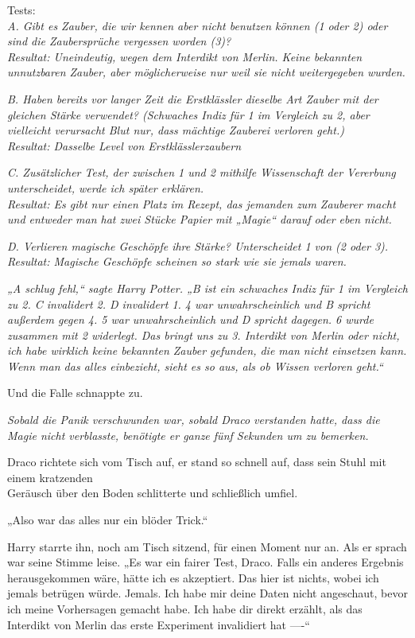 {Tests:\\ \emph{A. Gibt es Zauber, die wir kennen aber nicht benutzen können (1 oder 2) oder sind die Zaubersprüche vergessen worden (3)?}\\ \emph{Resultat: Uneindeutig, wegen dem Interdikt von Merlin. Keine bekannten unnutzbaren Zauber, aber möglicherweise nur weil sie nicht weitergegeben wurden.}

\emph{B. Haben bereits vor langer Zeit die Erstklässler dieselbe Art Zauber mit der gleichen Stärke verwendet? (Schwaches Indiz für 1 im Vergleich zu 2, aber vielleicht verursacht Blut nur, dass mächtige Zauberei verloren geht.)}\\ \emph{Resultat: Dasselbe Level von Erstklässlerzaubern}

\emph{C. Zusätzlicher Test, der zwischen 1 und 2 mithilfe Wissenschaft der Vererbung unterscheidet, werde ich später erklären.}\\ \emph{Resultat: Es gibt nur einen Platz im Rezept, das jemanden zum Zauberer macht und entweder man hat zwei Stücke Papier mit „Magie“ darauf oder eben nicht.}

\emph{D. Verlieren magische Geschöpfe ihre Stärke? Unterscheidet 1 von (2 oder 3).}\\ \emph{Resultat: Magische Geschöpfe scheinen so stark wie sie jemals waren.}

\emph{„A schlug fehl,“ sagte Harry Potter. „B ist ein schwaches Indiz für 1 im Vergleich zu 2. C invalidert 2. D invalidert 1. 4 war unwahrscheinlich und B spricht außerdem gegen 4. 5 war unwahrscheinlich und D spricht dagegen. 6 wurde zusammen mit 2 widerlegt. Das bringt uns zu 3. Interdikt von Merlin oder nicht, ich habe wirklich keine bekannten Zauber gefunden, die man nicht einsetzen kann. Wenn man das alles einbezieht, sieht es so aus, als ob Wissen verloren geht.“}

Und die Falle schnappte zu.

\emph{Sobald die Panik verschwunden war, sobald Draco verstanden hatte, dass die Magie nicht verblasste, benötigte er ganze fünf Sekunden um zu bemerken.}

Draco richtete sich vom Tisch auf, er stand so schnell auf, dass sein Stuhl mit einem kratzenden\\ Geräusch über den Boden schlitterte und schließlich umfiel.

„Also war das alles nur ein blöder Trick.“

Harry starrte ihn, noch am Tisch sitzend, für einen Moment nur an. Als er sprach war seine Stimme leise. „Es war ein fairer Test, Draco. Falls ein anderes Ergebnis herausgekommen wäre, hätte ich es akzeptiert. Das hier ist nichts, wobei ich jemals betrügen würde. Jemals. Ich habe mir deine Daten nicht angeschaut, bevor ich meine Vorhersagen gemacht habe. Ich habe dir direkt erzählt, als das Interdikt von Merlin das erste Experiment invalidiert hat ----“

}
